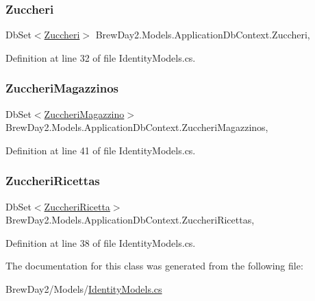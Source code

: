 \subsubsection{\texorpdfstring{Zuccheri}{Zuccheri}}
{\footnotesize\ttfamily Db\+Set$<$\mbox{\hyperlink{class_brew_day2_1_1_models_1_1_zuccheri}{Zuccheri}}$>$ Brew\+Day2.\+Models.\+Application\+Db\+Context.\+Zuccheri\hspace{0.3cm}{\ttfamily [get]}, {\ttfamily [set]}}



Definition at line 32 of file Identity\+Models.\+cs.

\mbox{\label{class_brew_day2_1_1_models_1_1_application_db_context_a9e4bfdd053967fcf43ef8a603b5a96bb}} 
\subsubsection{\texorpdfstring{Zuccheri\+Magazzinos}{ZuccheriMagazzinos}}
{\footnotesize\ttfamily Db\+Set$<$\mbox{\hyperlink{class_brew_day2_1_1_models_1_1_zuccheri_magazzino}{Zuccheri\+Magazzino}}$>$ Brew\+Day2.\+Models.\+Application\+Db\+Context.\+Zuccheri\+Magazzinos\hspace{0.3cm}{\ttfamily [get]}, {\ttfamily [set]}}



Definition at line 41 of file Identity\+Models.\+cs.

\mbox{\label{class_brew_day2_1_1_models_1_1_application_db_context_afa36c5941da8fd14bc9ddf5a78c9e786}} 
\subsubsection{\texorpdfstring{Zuccheri\+Ricettas}{ZuccheriRicettas}}
{\footnotesize\ttfamily Db\+Set$<$\mbox{\hyperlink{class_brew_day2_1_1_models_1_1_zuccheri_ricetta}{Zuccheri\+Ricetta}}$>$ Brew\+Day2.\+Models.\+Application\+Db\+Context.\+Zuccheri\+Ricettas\hspace{0.3cm}{\ttfamily [get]}, {\ttfamily [set]}}



Definition at line 38 of file Identity\+Models.\+cs.



The documentation for this class was generated from the following file\+:\begin{DoxyCompactItemize}
\item 
Brew\+Day2/\+Models/\mbox{\hyperlink{_identity_models_8cs}{Identity\+Models.\+cs}}\end{DoxyCompactItemize}
